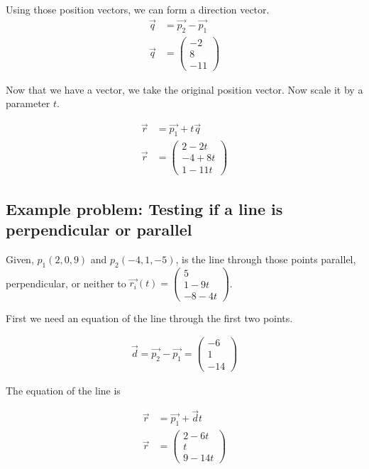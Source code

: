 Using those position vectors, we can form a direction vector. 
\begin{align*}
	\vec{q} &= \vec{p_2} - \vec{p_1}\\
	\vec{q} &= \begin{pmatrix} 
				-2 \\ 8 \\ -11
			 \end{pmatrix}
\end{align*}

Now that we have a vector, we take the original position vector. Now scale it by a parameter $t$. 

\begin{align*}
	\vec{r} &= \vec{p_1} + t\vec{q} \\ 
	\vec{r} &= \begin{pmatrix}
					2-2t \\
					-4+8t \\
					1-11t  
				\end{pmatrix}
\end{align*}

\subsection{Example problem: Testing if a line is perpendicular or parallel}

Given, $p_1(2,0,9)$ and $p_2(-4, 1, -5)$, is the line through those points parallel, perpendicular, or neither to 
$\vec{r_i}(t) = \begin{pmatrix}
	5 \\ 1-9t \\ -8 - 4t 
\end{pmatrix}$. 

\linebreak

First we need an equation of the line through the first two points. 

\begin{align*}
	\vec{d} = \vec{p_2} - \vec{p_1} = \begin{pmatrix}
		-6 \\ 
		1 \\ 
		-14
	\end{pmatrix} 
\end{align*}

The equation of the line is

\begin{align*}
	\vec{r} &= \vec{p_1} + \vec{d}t  \\ 
	\vec{r} &= \begin{pmatrix}
		2-6t \\ 
		t \\ 
		9-14t	
	\end{pmatrix}
\end{align*} 

